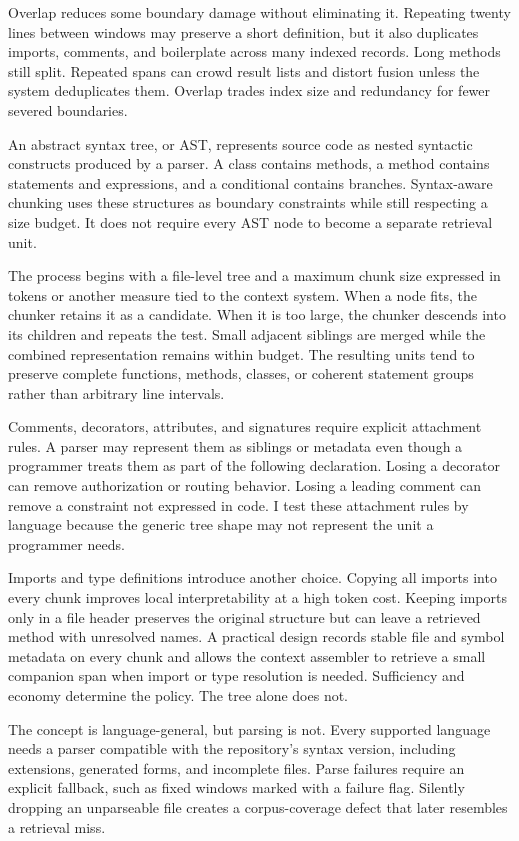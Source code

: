 Overlap reduces some boundary damage without eliminating it. Repeating twenty lines between windows may preserve a short definition, but it also duplicates imports, comments, and boilerplate across many indexed records. Long methods still split. Repeated spans can crowd result lists and distort fusion unless the system deduplicates them. Overlap trades index size and redundancy for fewer severed boundaries.

An abstract syntax tree, or AST, represents source code as nested syntactic constructs produced by a parser. A class contains methods, a method contains statements and expressions, and a conditional contains branches. Syntax-aware chunking uses these structures as boundary constraints while still respecting a size budget. It does not require every AST node to become a separate retrieval unit.

The process begins with a file-level tree and a maximum chunk size expressed in tokens or another measure tied to the context system. When a node fits, the chunker retains it as a candidate. When it is too large, the chunker descends into its children and repeats the test. Small adjacent siblings are merged while the combined representation remains within budget. The resulting units tend to preserve complete functions, methods, classes, or coherent statement groups rather than arbitrary line intervals.

Comments, decorators, attributes, and signatures require explicit attachment rules. A parser may represent them as siblings or metadata even though a programmer treats them as part of the following declaration. Losing a decorator can remove authorization or routing behavior. Losing a leading comment can remove a constraint not expressed in code. I test these attachment rules by language because the generic tree shape may not represent the unit a programmer needs.

Imports and type definitions introduce another choice. Copying all imports into every chunk improves local interpretability at a high token cost. Keeping imports only in a file header preserves the original structure but can leave a retrieved method with unresolved names. A practical design records stable file and symbol metadata on every chunk and allows the context assembler to retrieve a small companion span when import or type resolution is needed. Sufficiency and economy determine the policy. The tree alone does not.

The concept is language-general, but parsing is not. Every supported language needs a parser compatible with the repository's syntax version, including extensions, generated forms, and incomplete files. Parse failures require an explicit fallback, such as fixed windows marked with a failure flag. Silently dropping an unparseable file creates a corpus-coverage defect that later resembles a retrieval miss.

